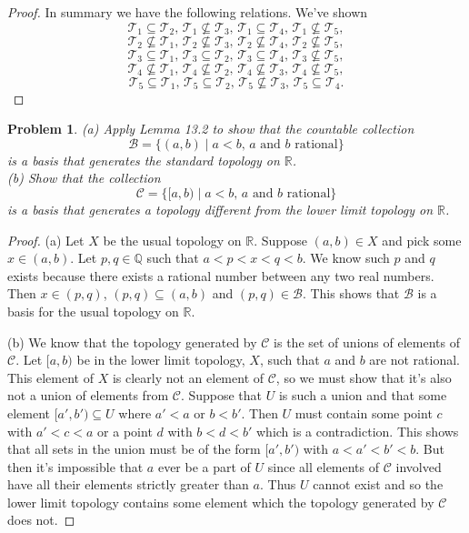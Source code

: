 \documentclass{article}
\newtheorem{problem}{Problem}
\begin{document}
\begin{proof}
In summary we have the following relations. We've shown
\[
\text{$\mathcal{T}_1 \subseteq \mathcal{T}_2$, $\mathcal{T}_1 \nsubseteq \mathcal{T}_3$, $\mathcal{T}_1 \subseteq \mathcal{T}_4$, $\mathcal{T}_1 \nsubseteq \mathcal{T}_5$},
\]
\[
\text{$\mathcal{T}_2 \nsubseteq \mathcal{T}_1$, $\mathcal{T}_2 \nsubseteq \mathcal{T}_3$, $\mathcal{T}_2 \nsubseteq \mathcal{T}_4$, $\mathcal{T}_2 \nsubseteq \mathcal{T}_5$},
\]
\[
\text{$\mathcal{T}_3 \subseteq \mathcal{T}_1$, $\mathcal{T}_3 \subseteq \mathcal{T}_2$, $\mathcal{T}_3 \subseteq \mathcal{T}_4$, $\mathcal{T}_3 \nsubseteq \mathcal{T}_5$},
\]
\[
\text{$\mathcal{T}_4 \nsubseteq \mathcal{T}_1$, $\mathcal{T}_4 \nsubseteq \mathcal{T}_2$, $\mathcal{T}_4 \nsubseteq \mathcal{T}_3$, $\mathcal{T}_4 \nsubseteq \mathcal{T}_5$},
\]
\[
\text{$\mathcal{T}_5 \subseteq \mathcal{T}_1$, $\mathcal{T}_5 \subseteq \mathcal{T}_2$, $\mathcal{T}_5 \nsubseteq \mathcal{T}_3$, $\mathcal{T}_5 \subseteq \mathcal{T}_4$}.
\]
\end{proof}

\begin{problem}
(a) Apply Lemma 13.2 to show that the countable collection
\[
\mathcal{B} = \{(a,b) \mid \text{$a < b$, $a$ and $b$ rational}\}
\]
is a basis that generates the standard topology on $\mathbb{R}$.\\
(b) Show that the collection
\[
\mathcal{C} = \{[a,b) \mid \text{$a < b$, $a$ and $b$ rational}\}
\]
is a basis that generates a topology different from the lower limit topology on $\mathbb{R}$.
\end{problem}
\begin{proof}
(a) Let $X$ be the usual topology on $\mathbb{R}$. Suppose $(a,b) \in X$ and pick some $x \in (a,b)$. Let $p,q \in \mathbb{Q}$ such that $a < p < x < q < b$. We know such $p$ and $q$ exists because there exists a rational number between any two real numbers. Then $x \in (p,q)$, $(p,q) \subseteq (a,b)$ and $(p,q) \in \mathcal{B}$. This shows that $\mathcal{B}$ is a basis for the usual topology on $\mathbb{R}$.

(b) We know that the topology generated by $\mathcal{C}$ is the set of unions of elements of $\mathcal{C}$. Let $[a,b)$ be in the lower limit topology, $X$, such that $a$ and $b$ are not rational. This element of $X$ is clearly not an element of $\mathcal{C}$, so we must show that it's also not a union of elements from $\mathcal{C}$. Suppose that $U$ is such a union and that some element $[a',b') \subseteq U$ where $a' < a$ or $b < b'$. Then $U$ must contain some point $c$ with $a' < c < a$ or a point $d$ with $b < d < b'$ which is a contradiction. This shows that all sets in the union must be of the form $[a', b')$ with $a < a' < b' < b$. But then it's impossible that $a$ ever be a part of $U$ since all elements of $\mathcal{C}$ involved have all their elements strictly greater than $a$. Thus $U$ cannot exist and so the lower limit topology contains some element which the topology generated by $\mathcal{C}$ does not.
\end{proof}
\end{document}
